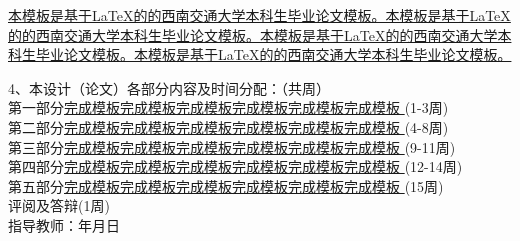 \uline{本模板是基于LaTeX的的西南交通大学本科生毕业论文模板。本模板是基于LaTeX的的西南交通大学本科生毕业论文模板。本模板是基于LaTeX的的西南交通大学本科生毕业论文模板。本模板是基于LaTeX的的西南交通大学本科生毕业论文模板。}

\newpage

\hspace{-0.85cm}4、本设计（论文）各部分内容及时间分配：（共\underline{}周）
\\第一部分\uline{\quad 完成模板完成模板完成模板完成模板完成模板完成模板 \quad}\hfill(1-3周)
\\第二部分\uline{\quad 完成模板完成模板完成模板完成模板完成模板完成模板 \quad}\hfill(4-8周)
\\第三部分\uline{\quad 完成模板完成模板完成模板完成模板完成模板完成模板 \quad}\hfill(9-11周)
\\第四部分\uline{\quad 完成模板完成模板完成模板完成模板完成模板完成模板 \quad}\hfill(12-14周)
\\第五部分\uline{\quad 完成模板完成模板完成模板完成模板完成模板完成模板 \quad}\hfill(15周)
\\评阅及答辩\hfill(1周)
\vspace{16cm}
\\指导教师：\hspace{4cm}年\hspace{1cm}月\hspace{1cm}日

